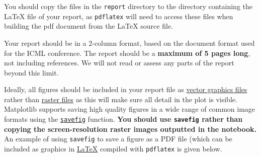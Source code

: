 \documentclass[11pt,]{article}
\begin{document}
You should copy the files in the \verb+report+ directory to the directory containing the LaTeX file of your report, as \verb+pdflatex+ will need to access these files when building the pdf document from the LaTeX source file.

Your report should be in a 2-column format, based on the document format used for the ICML conference. The report should be a \textbf{maximum of 5 pages long}, not including references.  We will not read or assess any parts of the report beyond this limit.

Ideally, all figures should be included in your report file as
\href{https://en.wikipedia.org/wiki/Vector_graphics}{vector graphics files}
rather than \href{https://en.wikipedia.org/wiki/Raster_graphics}{raster
files} as this will make sure all detail in the plot is visible.
Matplotlib supports saving high quality figures in a wide range of
common image formats using the
\href{http://matplotlib.org/api/pyplot_api.html\#matplotlib.pyplot.savefig}{\texttt{savefig}}
function. \textbf{You should use \texttt{savefig} rather than copying
the screen-resolution raster images outputted in the notebook.} An
example of using \texttt{savefig} to save a figure as a PDF file (which
can be included as graphics in
\href{https://en.wikibooks.org/wiki/LaTeX/Importing_Graphics}{LaTeX}
compiled with \texttt{pdflatex} 
is given below.
\end{document}
